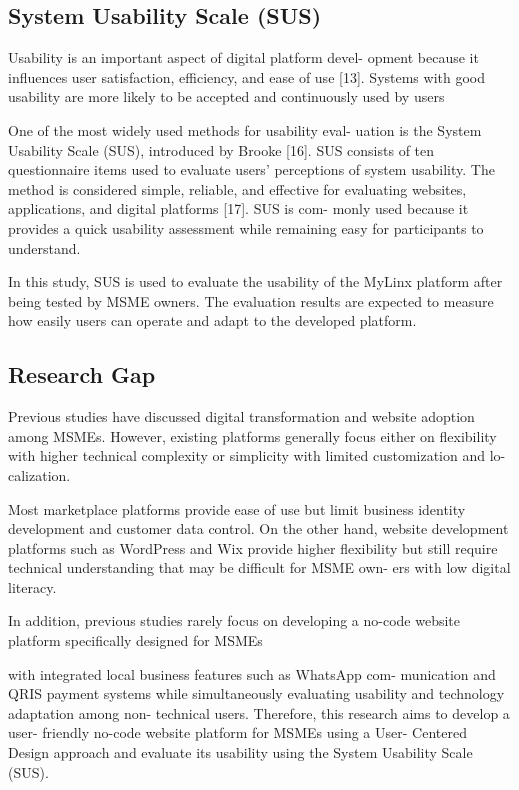 \documentclass[conference]{IEEEtran}
\begin{document}
\subsection{System Usability Scale (SUS)}
Usability is an important aspect of digital platform devel- opment because it influences user satisfaction, efficiency, and ease of use [13]. Systems with good usability are more likely to be accepted and continuously used by users

One of the most widely used methods for usability eval- uation is the System Usability Scale (SUS), introduced by Brooke [16]. SUS consists of ten questionnaire items used to evaluate users’ perceptions of system usability. The method is considered simple, reliable, and effective for evaluating websites, applications, and digital platforms [17]. SUS is com- monly used because it provides a quick usability assessment while remaining easy for participants to understand.

In this study, SUS is used to evaluate the usability of the MyLinx platform after being tested by MSME owners. The evaluation results are expected to measure how easily users can operate and adapt to the developed platform.

\subsection{Research Gap}
Previous studies have discussed digital transformation and website adoption among MSMEs. However, existing platforms generally focus either on flexibility with higher technical complexity or simplicity with limited customization and lo- calization.

Most marketplace platforms provide ease of use but limit business identity development and customer data control. On the other hand, website development platforms such as WordPress and Wix provide higher flexibility but still require technical understanding that may be difficult for MSME own- ers with low digital literacy.

In addition, previous studies rarely focus on developing a no-code website platform specifically designed for MSMEs
 
with integrated local business features such as WhatsApp com- munication and QRIS payment systems while simultaneously evaluating usability and technology adaptation among non- technical users. Therefore, this research aims to develop a user- friendly no-code website platform for MSMEs using a User- Centered Design approach and evaluate its usability using the System Usability Scale (SUS).
\end{document}
